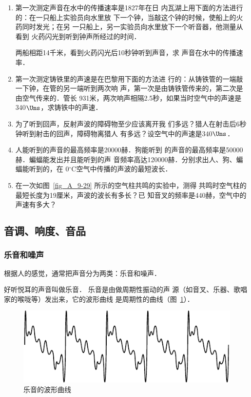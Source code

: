 \begin{enumerate}
\item 第一次测定声音在水中的传播速率是1827年在日
内瓦湖上用下面的方法进行的：在一只船上实验员向水里放
下一个钟，当敲这个钟的时候，使船上的火药同时发光；在另
一只船上，另一实验员向水里放下一个听音器，他测量从看到
火药闪光到听到钟声所经过的时间．

两船相距14千米，看到火药闪光后10秒钟听到声音，求
声音在水中的传播速率．

\item 第一次测定铸铁里的声速是在巴黎用下面的方法进
行的：从铸铁管的一端敲一下钟，在管的另一端听到两次响
声，第一次是由铸铁管传来的，第二次是由空气传来的．管长
931米，两次响声相隔2.5秒，如果当时空气中的声速是340$\Ums$，求铸铁中的声速．

\item 为了听到回声，反射声波的障碍物至少应该离开我
们多远？猎人在射击后6秒钟听到射击的回声，障碍物离猎人
有多远？设空气中的声速是340$\Ums$．
\item 人能听到的声音的最高频率是20000赫．狗能听到
的声音的最高频率是50000赫．蝙蝠能发出并且能听到的声
音频率高达120000赫．分别求出人、狗、蝙蝠能听到的，在
0$^{\circ}$C空气中传播的声波的最短波长．
\item 在一次如图~\ref{fig_A_9-29} 所示的空气柱共鸣的实验中，测得
共鸣时空气柱的最短长度为19厘米，声波的波长有多长？已
知音叉的频率是440赫，空气中的声速有多大？


\end{enumerate}

\subsection{音调、响度、音品}
\subsubsection{乐音和噪声}

根据人的感觉，通常把声音分为两类：乐音和噪声．

好听悦耳的声音叫做乐音．
乐音是由做周期性振动的声
源（如音叉、乐器、歌唱家的喉咙等）发出来，它的波形曲线
是周期性的曲线（图~\ref{fig_A_9-30}）．
\begin{figure}[htbp]
    \centering
    \includegraphics{fig/A/9-30.pdf}
    \caption{乐音的波形曲线}\label{fig_A_9-30}
\end{figure}

